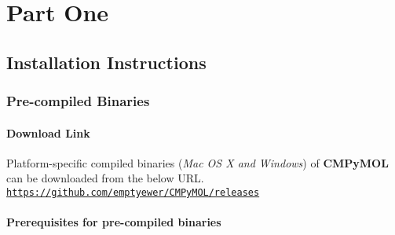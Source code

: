 \documentclass[11pt,fleqn]{book} %
\begin{document}

\pagestyle{empty} %

\tableofcontents %

\cleardoublepage %

\pagestyle{fancy} %


\part{Part One}



\chapter{Installation Instructions}

\section{Pre-compiled Binaries}
\subsection{Download Link}\label{download link}

    Platform-specific compiled binaries (\emph{Mac OS X and Windows}) of \textbf{CMPyMOL} can be downloaded from the below URL. \\

    \texttt{\href{https://github.com/emptyewer/CMPyMOL/releases}{https://github.com/emptyewer/CMPyMOL/releases}}


    \subsection{Prerequisites for pre-compiled binaries}
\end{document}
